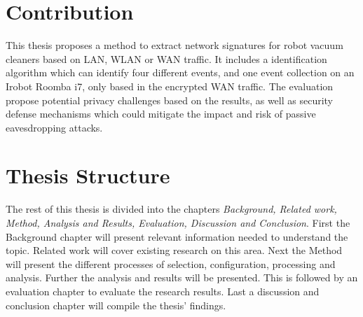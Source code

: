 \section{Contribution}
This thesis proposes a method to extract network signatures for robot vacuum cleaners based on LAN, WLAN or WAN traffic. It includes a identification algorithm which can identify four different events, and one event collection on an Irobot Roomba i7, only based in the encrypted WAN traffic. The evaluation propose potential privacy challenges based on the results, as well as security defense mechanisms which could mitigate the impact and risk of passive eavesdropping attacks. 

\section{Thesis Structure}
The rest of this thesis is divided into the chapters \textit{Background, Related work, Method, Analysis and Results, Evaluation, Discussion and Conclusion}. First the Background chapter will present relevant information needed to understand the topic. Related work will cover existing research on this area. Next the Method will present the different processes of selection, configuration, processing and analysis. Further the analysis and results will be presented. This is followed by an evaluation chapter to evaluate the research results. Last a discussion and conclusion chapter will compile the thesis' findings. 



